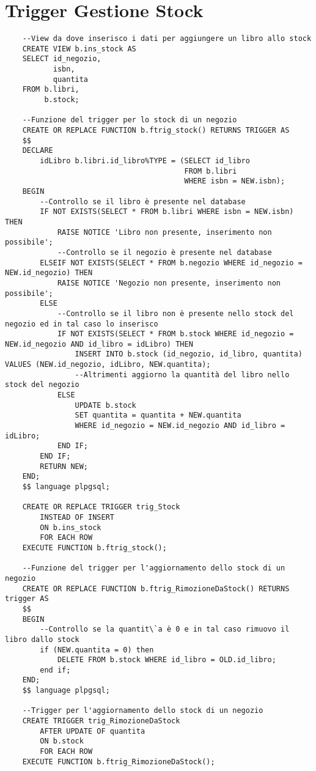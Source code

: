 \section{Trigger Gestione Stock}
\begin{lstlisting}
    --View da dove inserisco i dati per aggiungere un libro allo stock
    CREATE VIEW b.ins_stock AS
    SELECT id_negozio,
           isbn,
           quantita
    FROM b.libri,
         b.stock;
    
    --Funzione del trigger per lo stock di un negozio
    CREATE OR REPLACE FUNCTION b.ftrig_stock() RETURNS TRIGGER AS
    $$
    DECLARE
        idLibro b.libri.id_libro%TYPE = (SELECT id_libro
                                         FROM b.libri
                                         WHERE isbn = NEW.isbn);
    BEGIN
        --Controllo se il libro è presente nel database
        IF NOT EXISTS(SELECT * FROM b.libri WHERE isbn = NEW.isbn) THEN
            RAISE NOTICE 'Libro non presente, inserimento non possibile';
            --Controllo se il negozio è presente nel database
        ELSEIF NOT EXISTS(SELECT * FROM b.negozio WHERE id_negozio = NEW.id_negozio) THEN
            RAISE NOTICE 'Negozio non presente, inserimento non possibile';
        ELSE
            --Controllo se il libro non è presente nello stock del negozio ed in tal caso lo inserisco
            IF NOT EXISTS(SELECT * FROM b.stock WHERE id_negozio = NEW.id_negozio AND id_libro = idLibro) THEN
                INSERT INTO b.stock (id_negozio, id_libro, quantita) VALUES (NEW.id_negozio, idLibro, NEW.quantita);
                --Altrimenti aggiorno la quantità del libro nello stock del negozio
            ELSE
                UPDATE b.stock
                SET quantita = quantita + NEW.quantita
                WHERE id_negozio = NEW.id_negozio AND id_libro = idLibro;
            END IF;
        END IF;
        RETURN NEW;
    END;
    $$ language plpgsql;
    
    CREATE OR REPLACE TRIGGER trig_Stock
        INSTEAD OF INSERT
        ON b.ins_stock
        FOR EACH ROW
    EXECUTE FUNCTION b.ftrig_stock();
    
    --Funzione del trigger per l'aggiornamento dello stock di un negozio
    CREATE OR REPLACE FUNCTION b.ftrig_RimozioneDaStock() RETURNS trigger AS
    $$
    BEGIN
        --Controllo se la quantit\`a è 0 e in tal caso rimuovo il libro dallo stock
        if (NEW.quantita = 0) then
            DELETE FROM b.stock WHERE id_libro = OLD.id_libro;
        end if;
    END;
    $$ language plpgsql;
    
    --Trigger per l'aggiornamento dello stock di un negozio
    CREATE TRIGGER trig_RimozioneDaStock
        AFTER UPDATE OF quantita
        ON b.stock
        FOR EACH ROW
    EXECUTE FUNCTION b.ftrig_RimozioneDaStock();
\end{lstlisting}

